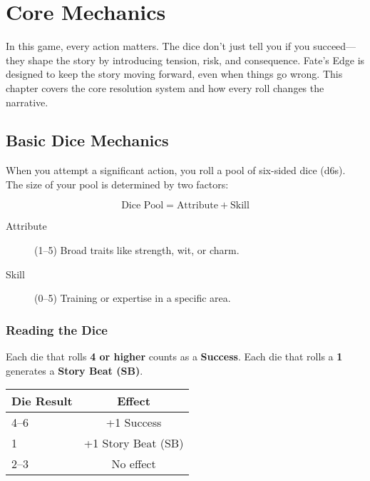 
\chapter{Core Mechanics} \label{ch:core-mechanics}

\begin{multicols}{2}

In this game, every action matters. The dice don't just tell you if you succeed—they shape the story by introducing tension, risk, and consequence. Fate’s Edge is designed to keep the story moving forward, even when things go wrong. This chapter covers the core resolution system and how every roll changes the narrative.

\section{Basic Dice Mechanics} 

When you attempt a significant action, you roll a pool of six-sided dice (d6s). The size of your pool is determined by two factors:

\[
\text{Dice Pool} = \text{Attribute} + \text{Skill}
\]

\begin{description}
  \item[Attribute] (1–5) Broad traits like strength, wit, or charm. 
  \item[Skill] (0–5) Training or expertise in a specific area. 
\end{description}

\subsection*{Reading the Dice}

Each die that rolls \textbf{4 or higher} counts as a \textbf{Success}.  
Each die that rolls a \textbf{1} generates a \textbf{Story Beat (SB)}.

\begin{center}
\small
\begin{tabular}{lc}
\toprule
\textbf{Die Result} & \textbf{Effect} \\
\midrule
4--6 & +1 Success \\
1 & +1 Story Beat (SB) \\
2--3 & No effect \\
\bottomrule
\end{tabular}
\end{center}


\end{multicols}
